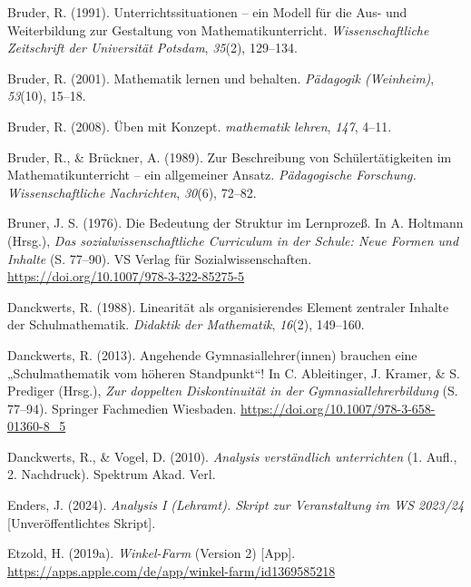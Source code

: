 \documentclass[
]{scrbook}
\newlength{\cslhangindent}
\newenvironment{CSLReferences}[2] %
 {\begin{list}{}{%
  \setlength{\itemindent}{0pt}
  \setlength{\leftmargin}{0pt}
  \setlength{\parsep}{0pt}
  \ifodd #1
   \setlength{\leftmargin}{\cslhangindent}
   \setlength{\itemindent}{-1\cslhangindent}
  \fi
  \setlength{\itemsep}{#2\baselineskip}}}
 {\end{list}}
\theoremstyle{definition}
\theoremstyle{definition}
\theoremstyle{definition}
\theoremstyle{definition}
\theoremstyle{remark}
\begin{document}
\begin{CSLReferences}{1}{0}
Bruder, R. (1991). Unterrichtssituationen -- ein {Modell} für die {Aus}- und {Weiterbildung} zur {Gestaltung} von {Mathematikunterricht}. \emph{Wissenschaftliche Zeitschrift der Universität Potsdam}, \emph{35}(2), 129--134.

Bruder, R. (2001). Mathematik lernen und behalten. \emph{Pädagogik (Weinheim)}, \emph{53}(10), 15--18.

Bruder, R. (2008). Üben mit {Konzept}. \emph{mathematik lehren}, \emph{147}, 4--11.

Bruder, R., \& Brückner, A. (1989). Zur {Beschreibung} von {Schülertätigkeiten} im {Mathematikunterricht} -- ein allgemeiner {Ansatz}. \emph{Pädagogische Forschung. Wissenschaftliche Nachrichten}, \emph{30}(6), 72--82.

Bruner, J. S. (1976). Die {Bedeutung} der {Struktur} im {Lernprozeß}. In A. Holtmann (Hrsg.), \emph{Das sozialwissenschaftliche {Curriculum} in der {Schule}: {Neue} {Formen} und {Inhalte}} (S. 77--90). VS Verlag für Sozialwissenschaften. \url{https://doi.org/10.1007/978-3-322-85275-5}

Danckwerts, R. (1988). Linearität als organisierendes Element zentraler Inhalte der Schulmathematik. \emph{Didaktik der Mathematik}, \emph{16}(2), 149--160.

Danckwerts, R. (2013). Angehende {Gymnasiallehrer}(innen) brauchen eine „{Schulmathematik} vom höheren {Standpunkt}``! In C. Ableitinger, J. Kramer, \& S. Prediger (Hrsg.), \emph{Zur doppelten {Diskontinuität} in der {Gymnasiallehrerbildung}} (S. 77--94). Springer Fachmedien Wiesbaden. \url{https://doi.org/10.1007/978-3-658-01360-8_5}

Danckwerts, R., \& Vogel, D. (2010). \emph{Analysis verständlich unterrichten} (1. Aufl., 2. Nachdruck). Spektrum Akad. Verl.

Enders, J. (2024). \emph{Analysis {I} ({Lehramt}). {Skript} zur {Veranstaltung} im {WS} 2023/24} {[}Unveröffentlichtes Skript{]}.

Etzold, H. (2019a). \emph{Winkel-{Farm}} (Version 2) {[}App{]}. \url{https://apps.apple.com/de/app/winkel-farm/id1369585218}


\end{CSLReferences}
\end{document}
